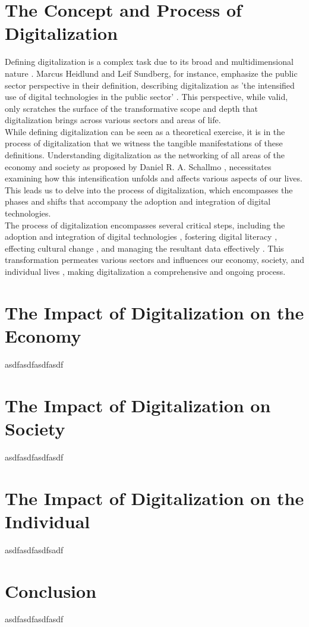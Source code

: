 \documentclass[12pt]{article}
\begin{document}
\section{The Concept and Process of Digitalization}
Defining digitalization is a complex task due to its broad and multidimensional nature \cite{JasonBloomberg.2018}. Marcus Heidlund and Leif Sundberg, for instance, emphasize the public sector perspective in their definition, describing digitalization as 'the intensified use of digital technologies in the public sector' \cite{Heidlund.2023}. This perspective, while valid, only scratches the surface of the transformative scope and depth that digitalization brings across various sectors and areas of life. \\
While defining digitalization can be seen as a theoretical exercise, it is in the process of digitalization that we witness the tangible manifestations of these definitions. Understanding digitalization as  the networking of all areas of the economy and society as proposed by Daniel R. A. Schallmo \cite{Schallmo.}, necessitates examining how this intensification unfolds and affects various aspects of our lives. This leads us to delve into the process of digitalization, which encompasses the phases and shifts that accompany the adoption and integration of digital technologies. \\
The process of digitalization encompasses several critical steps, including the adoption and integration of digital technologies \cite{GablerWirtschaftslexikon.5312023}, fostering digital literacy \cite{vanAckeren.2019}, effecting cultural change \cite{Nevmatulina.2022}, and managing the resultant data effectively \cite{DORDUNCU.2021}. This transformation permeates various sectors and influences our economy, society, and individual lives \cite{HenningHummert.2018}, making digitalization a comprehensive and ongoing process.

\section{The Impact of Digitalization on the Economy}
asdfasdfasdfasdf

\section{The Impact of Digitalization on Society}
asdfasdfasdfasdf

\section{The Impact of Digitalization on the Individual}
asdfasdfasdfsadf

\section{Conclusion}
asdfasdfasdfasdf

\newpage

\end{document}
